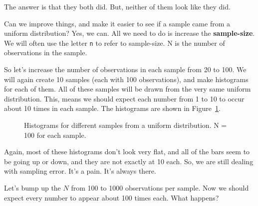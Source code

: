 \documentclass[
  letterpaper,
  DIV=11,
  numbers=noendperiod]{scrreprt}
\begin{document}
The answer is that they both did. But, neither of them look like they
did.

Can we improve things, and make it easier to see if a sample came from a
uniform distribution? Yes, we can. All we need to do is increase the
\textbf{sample-size}. We will often use the letter \texttt{n} to refer
to sample-size. N is the number of observations in the sample.

So let's increase the number of observations in each sample from 20 to
100. We will again create 10 samples (each with 100 observations), and
make histograms for each of them. All of these samples will be drawn
from the very same uniform distribution. This, means we should expect
each number from 1 to 10 to occur about 10 times in each sample. The
histograms are shown in Figure~\ref{fig-5unifsamp100}.

\begin{figure}


\caption{\label{fig-5unifsamp100}Histograms for different samples from a
uniform distribution. N = 100 for each sample.}

\end{figure}%

Again, most of these histograms don't look very flat, and all of the
bars seem to be going up or down, and they are not exactly at 10 each.
So, we are still dealing with sampling error. It's a pain. It's always
there.

Let's bump up the \(N\) from 100 to 1000 observations per sample. Now we
should expect every number to appear about 100 times each. What happens?
\end{document}
